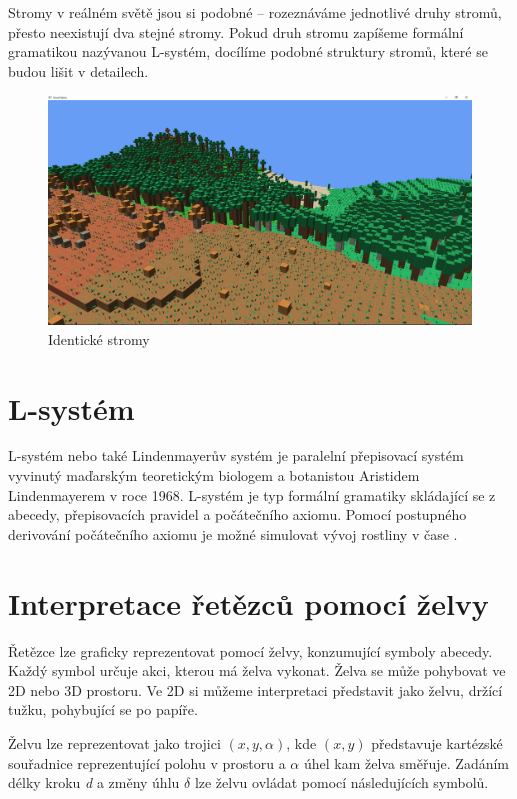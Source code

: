 \documentclass[thesis=M,czech]{FITthesis}[2019/12/23]
\begin{document}
Stromy v reálném světě jsou si podobné -- rozeznáváme jednotlivé druhy stromů, přesto neexistují dva stejné stromy. Pokud druh stromu zapíšeme formální gramatikou nazývanou L-systém, docílíme podobné struktury stromů, které se budou lišit v detailech.

\begin{figure}\centering
	\includegraphics[width=\textwidth]{images/identical_trees}
	\caption[Identické stromy]{Identické stromy}\label{fig:identicke_stromy}
\end{figure}

\section{L-systém}
L-systém nebo také Lindenmayerův systém je paralelní přepisovací systém vyvinutý maďarským teoretickým biologem a botanistou Aristidem Lindenmayerem v roce 1968. L-systém je typ formální gramatiky skládající se z abecedy, přepisovacích pravidel a počátečního axiomu. Pomocí postupného derivování počátečního axiomu je možné simulovat vývoj rostliny v čase \cite{pcgbook75}.

\section{Interpretace řetězců pomocí želvy}
Řetězce lze graficky reprezentovat pomocí želvy, konzumující symboly abecedy. Každý symbol určuje akci, kterou má želva vykonat. Želva se může pohybovat ve 2D nebo 3D prostoru. Ve 2D si můžeme interpretaci představit jako želvu, držící tužku, pohybující se po papíře.

Želvu lze reprezentovat jako trojici $(x, y, \alpha)$, kde $(x, y)$ představuje kartézské souřadnice reprezentující polohu v prostoru a $\alpha$ úhel kam želva směřuje. Zadáním délky kroku \textit{d} a změny úhlu $\delta$ lze želvu ovládat pomocí následujících symbolů.
\end{document}
